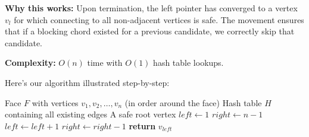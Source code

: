 \documentclass[12pt,a4paper]{article}
\begin{document}
\textbf{Why this works:} Upon termination, the left pointer has converged to a vertex $v_l$ for which connecting to all non-adjacent vertices is safe. The movement ensures that if a blocking chord existed for a previous candidate, we correctly skip that candidate.

\textbf{Complexity:} $O(n)$ time with $O(1)$ hash table lookups.

Here's our algorithm illustrated step-by-step:

\begin{algorithm}
\caption{Find Safe Root - Visual Walkthrough}
\begin{algorithmic}[1]
\REQUIRE Face $F$ with vertices $v_1, v_2, \ldots, v_n$ (in order around the face)
\REQUIRE Hash table $H$ containing all existing edges
\ENSURE A safe root vertex
\STATE $left \leftarrow 1$ 
\STATE $right \leftarrow n-1$ 
 
        \STATE $left \leftarrow left + 1$ 
    \ELSE
        \STATE $right \leftarrow right - 1$ 
    \ENDIF
\ENDWHILE
\STATE \textbf{return} $v_{left}$ 
\end{algorithmic}
\end{algorithm}
\end{document}
